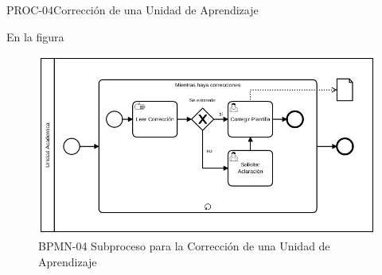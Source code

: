 \begin{BPMN}{PROC-04}{Corrección de una Unidad de Aprendizaje}{}
\end{BPMN}
En la figura \hyperref[]{}
\begin{figure}[htbp]
	\begin{center}
	\includegraphics[width=.95\textwidth]{C1-DP/SP4/Image/CorreccionBPMN}
		\caption{BPMN-04 Subproceso para la  Corrección de una Unidad de Aprendizaje}
		\label{fig:BPMN-04}
	\end{center}
\end{figure}
